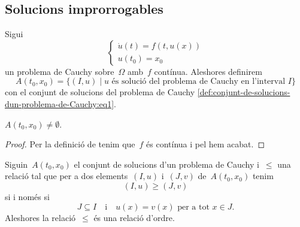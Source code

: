 \documentclass[../equacions-diferencials-I.tex]{subfiles}
\begin{document}
    \subsection{Solucions improrrogables}
    \begin{definition}
        \label{def:conjunt-de-solucions-dun-problema-de-Cauchy}
        Sigui
        \begin{equation}
            \label{def:conjunt-de-solucions-dun-problema-de-Cauchy:eq1}
            \begin{cases}
                \displaystyle \dot{u}(t)=f(t,u(x)) \\
                \displaystyle u(t_{0})=x_{0}
            \end{cases}
        \end{equation}
        un problema de Cauchy sobre~\(\Omega\) amb~\(f\) contínua.
        Aleshores definirem
        \[
            A(t_{0},x_{0})=\{(I,u)\mid u\text{ és solució del problema de Cauchy en l'interval }I\}
        \]
        con el conjunt de solucions del problema de Cauchy \eqref{def:conjunt-de-solucions-dun-problema-de-Cauchy:eq1}.
    \end{definition}
    \begin{observation}
        \label{obs:el-conjunt-de-solucions-dun-problema-de-Cauchy-amb-f-continua-es-no-buit}
        \(A(t_{0},x_{0})\neq\emptyset\).
    \end{observation}
    \begin{proof}
        Per la definició de  tenim que~\(f\) és contínua i pel  hem acabat.
    \end{proof}
    \begin{proposition}
        \label{prop:la-prolongacio-es-una-relacio-dordre}
        Siguin~\(A(t_{0},x_{0})\) el conjunt de solucions d'un problema de Cauchy i~\(\leq\) una relació tal que per a dos elements~\((I,u)\) i~\((J,v)\) de~\(A(t_{0},x_{0})\) tenim
        \[
            (I,u)\geq(J,v)
        \]
        si i només si
        \[
            J\subseteq I\quad\text{i}\quad u(x)=v(x)\text{ per a tot }x\in J.
        \]
        Aleshores la relació~\(\leq\) és una relació d'ordre.
    \end{proposition}
\end{document}
